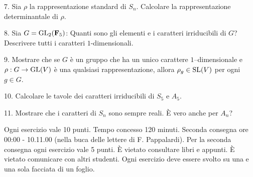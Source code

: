 \item{7.} Sia $\rho$ la rappresentazione standard di $S_n$. Calcolare
la rappresentazione determinantale di $\rho$.
\item{8.} Sia $G={\rm GL}_2({\bf F}_5)$:
 Quanti sono gli elementi e i caratteri irriducibili di $G$?
 Descrivere tutti i caratteri $1$-dimensionali.
\item{9.} Mostrare che se $G$ \`e un gruppo che ha un unico
carattere $1$--dimensionale e $\rho: G\rightarrow{\rm GL}(V)$
\`e una qualsiasi rappresentazione, allora $\rho_g\in{\rm SL}(V)$
per ogni $g\in G$.
\item{10.} Calcolare le tavole dei caratteri irriducibili
di $S_5$ e $A_5$.
\item{11.} Mostrare che i caratteri di $S_n$ sono sempre reali.
\`E vero anche per $A_n$?\bigskip

 Ogni esercizio vale 10 punti. Tempo concesso 120 minuti. Seconda
consegna ore 00:00 - 10.11.00 (nella buca delle lettere di F. Pappalardi). 
Per la seconda consegna ogni esercizio vale 5 punti. \`{E} vietato consultare libri e
appunti. \`{E} vietato comunicare con altri studenti. Ogni esercizio deve essere svolto
su una e una sola facciata di un foglio.
\bye
